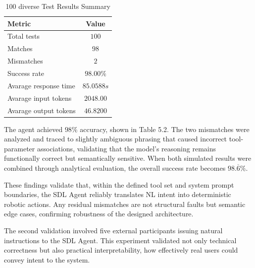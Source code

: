 \begin{table}[H]
\centering
\caption{100 diverse Test Results Summary}
\begin{tabular}{l c}
\hline
\textbf{Metric} & \textbf{Value} \\ \hline
Total tests     & $100$ \\
Matches & $98$ \\
Mismatches      & $2$ \\
Success rate    & $98.00\%$ \\ 
Avarage response time & $85.0588s$ \\
Avarage input tokens    & $2048.00$ \\ 
Avarage output tokens    & $46.8200$ \\ \hline
\end{tabular}
\end{table}

The agent achieved $98\%$ accuracy, shown in Table 5.2. The two mismatches were analyzed and traced to slightly ambiguous phrasing that caused incorrect tool-parameter associations, validating that the model’s reasoning remains functionally correct but semantically sensitive. When both simulated results were combined through analytical evaluation, the overall success rate becomes $98.\overline{6}\%$.

These findings validate that, within the defined tool set and system prompt boundaries, the SDL Agent reliably translates NL intent into deterministic robotic actions. Any residual mismatches are not structural faults but semantic edge cases, confirming robustness of the designed architecture.



The second validation involved five external participants issuing natural instructions to the SDL Agent.  
This experiment validated not only technical correctness but also practical interpretability, how effectively real users could convey intent to the system.  

\begin{table}[H]
\centering
\caption{Analytical Results of Participant Inputs}
\end{table}

